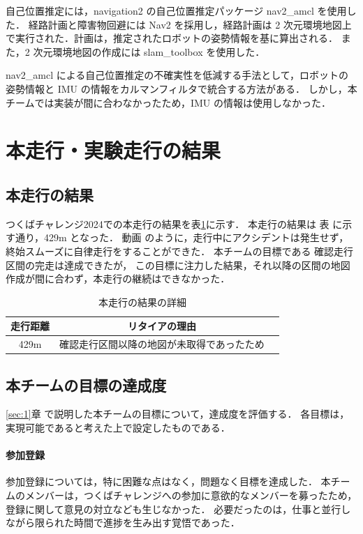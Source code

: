 \documentclass[twocolumn,9pt]{jsproceedings}
\begin{document}
自己位置推定には，navigation2 の自己位置推定パッケージ nav2\_amcl \cite{nav2_amcl} を使用した．
経路計画と障害物回避には Nav2 \cite{nav2} を採用し，経路計画は 2 次元環境地図上で実行された．計画は，推定されたロボットの姿勢情報を基に算出される．
また，2 次元環境地図の作成には slam\_toolbox \cite{slam_toolbox} を使用した．

nav2\_amcl による自己位置推定の不確実性を低減する手法として，ロボットの姿勢情報と IMU の情報をカルマンフィルタで統合する方法がある．
しかし，本チームでは実装が間に合わなかったため，IMU の情報は使用しなかった．

\section{本走行・実験走行の結果}
\subsection{本走行の結果}

つくばチャレンジ2024での本走行の結果を表\ref{MainRun}に示す．
本走行の結果は 表 に示す通り，429m となった．
動画 \cite{youtube_real_run} のように，走行中にアクシデントは発生せず，終始スムーズに自律走行をすることができた．
本チームの目標である 確認走行区間の完走は達成できたが，
この目標に注力した結果，それ以降の区間の地図作成が間に合わず，本走行の継続はできなかった．
\begin{table}[H]
  \caption{本走行の結果の詳細}
  \label{MainRun}
  \begin{tabular}{|c|c|p{4.0cm}|}
    \hline
    走行距離 & リタイアの理由 \\
    \hline
    429m   & 確認走行区間以降の地図が未取得であったため \\
    \hline
  \end{tabular}
\end{table}

\subsection{本チームの目標の達成度}

\ref{sec:1}章 で説明した本チームの目標について，達成度を評価する．
各目標は，実現可能であると考えた上で設定したものである．

\paragraph{参加登録}
参加登録については，特に困難な点はなく，問題なく目標を達成した．
本チームのメンバーは，つくばチャレンジへの参加に意欲的なメンバーを募ったため，登録に関して意見の対立なども生じなかった．
必要だったのは，仕事と並行しながら限られた時間で進捗を生み出す覚悟であった．
\end{document}
